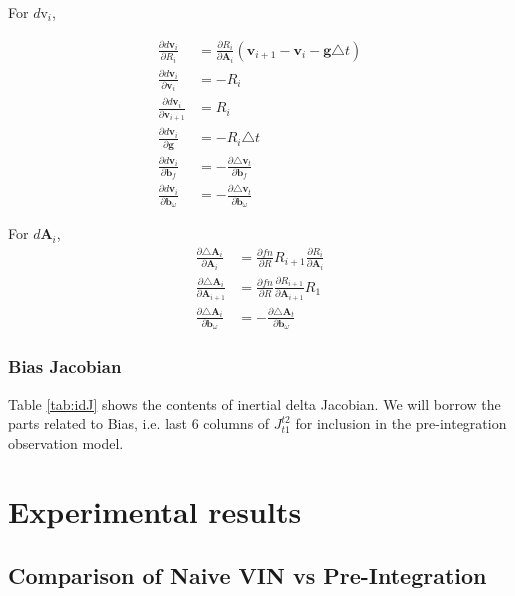\documentclass[12pt]{article}   %
\begin{document}
For $d\text{v}_{i}$,

\begin{align}
\frac{\partial d\textbf{v}_{i}}{\partial R_{i}} &= \frac{\partial R_i}{\partial \textbf{A}_i} (\textbf{v}_{i+1} - \textbf{v}_i - \textbf{g} \triangle t) \\
\frac{\partial d\textbf{v}_{i}}{\partial \textbf{v}_{i}} &= -R_i \\
\frac{\partial d\textbf{v}_{i}}{\partial \textbf{v}_{i+1}} &= R_i \\
\frac{\partial d\textbf{v}_{i}}{\partial \textbf{g}} &= -R_i \triangle t \\
\frac{\partial d\textbf{v}_{i}}{\partial \textbf{b}_f} &= - \frac{\partial \triangle \textbf{v}_t}{\partial \textbf{b}_f}\\
\frac{\partial d\textbf{v}_{i}}{\partial \textbf{b}_\omega} &= - \frac{\partial \triangle \textbf{v}_t}{\partial \textbf{b}_\omega}
\end{align}

For $d\textbf{A}_{i}$,
\begin{align}
\frac{\partial \triangle \textbf{A}_{i}}{\partial \textbf{A}_{i}} &= \frac{\partial fn}{\partial R} R_{i+1} \frac{\partial R_i}{\partial \textbf{A}_{i}}\\
\frac{\partial \triangle \textbf{A}_{i}}{\partial \textbf{A}_{i+1}} &= \frac{\partial fn}{\partial R} \frac{\partial R_{i+1}}{\partial \textbf{A}_{i+1}} R_{1} \\
\frac{\partial \triangle \textbf{A}_{i}}{\partial \textbf{b}_\omega} &= - \frac{\partial \triangle \textbf{A}_t}{\partial \textbf{b}_\omega}
\end{align}

\subsubsection{Bias Jacobian}
Table \ref{tab:idJ} shows the contents of inertial delta Jacobian. We will borrow the parts related to Bias, i.e. last 6 columns of $J_{t1}^{t2}$ for inclusion in the pre-integration observation model.

\section{Experimental results}
\subsection{Comparison of Naive VIN vs Pre-Integration}
\end{document}
